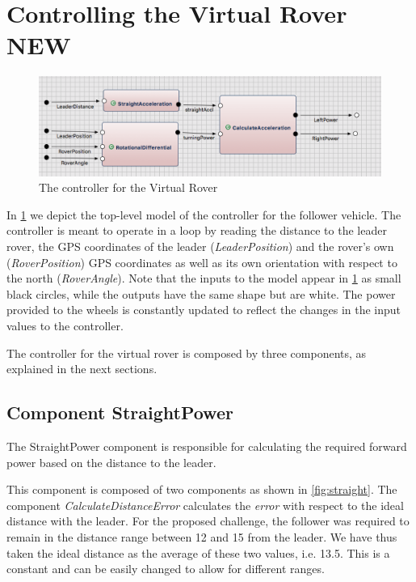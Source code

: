 \section{Controlling the Virtual Rover NEW}
\label{sec:control_vr_model}

\begin{figure}[!h]
	\centering
	\includegraphics[width=1\textwidth]{images/acc.png}
	\caption{The controller for the Virtual Rover}
	\label{fig:acc}
\end{figure}

In \fig\ref{fig:acc} we depict the top-level model of the controller for the
follower vehicle. The controller is meant to operate in a loop by reading the
 {distance} to
the leader rover, the GPS coordinates of the leader (\textit{LeaderPosition})
and the rover's own (\textit{RoverPosition}) GPS coordinates as well as its own
orientation with respect to the north (\textit{RoverAngle}).
Note that the inputs to the model appear in \fig\ref{fig:acc}  as small black
circles, while the outputs have the same shape but are white. The power provided
to the wheels is constantly updated to reflect the changes in the input values
to the controller.

The controller for the virtual rover is composed by three \af components,
as explained in the next sections.

\subsection{Component StraightPower}
The \textsf{StraightPower} component is responsible for calculating the required
 forward power based on the distance to the leader.

This component is composed of two components as shown in \fig\ref{fig:straight}.
The component \textit{CalculateDistanceError} calculates the \textit{error} with
respect to the ideal distance with the leader. For the proposed challenge, the
follower was required to remain in the distance range between 12 and 15 from the
leader. We have thus taken the ideal distance as the average of these two
values, i.e. 13.5. This is a constant and can be easily changed to allow for different
ranges.

